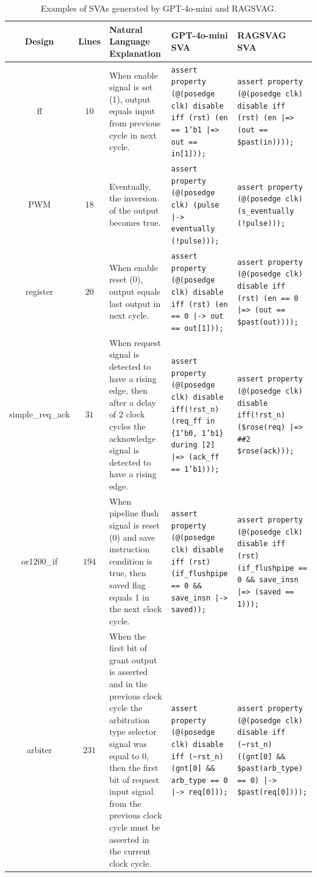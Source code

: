 \begin{table}[ht]
    \centering
    \caption{Examples of SVAs generated by GPT-4o-mini and RAGSVAG.}
    \label{tab:example_svas}
    \begin{tabular}{|c|c|p{3.8cm}|p{5.4cm}|p{5.4cm}|}
        \hline
        \textbf{Design} & \textbf{Lines} & \textbf{Natural Language Explanation} & \textbf{GPT-4o-mini SVA} & \textbf{RAGSVAG SVA} \\
        \hline
        ff & $10$ & When enable signal is set (1), output equals input from previous cycle in next cycle. & \texttt{assert property (@(posedge clk) disable iff (rst) (en == 1'b1 |=> out == in[1]));} & \texttt{assert property (@(posedge clk) disable iff (rst) (en |=> (out == \$past(in))));} \\
        \hline
        PWM & $18$ & Eventually, the inversion of the output becomes true. & \texttt{assert property (@(posedge clk) (pulse |-> eventually (!pulse)));} & \texttt{assert property (@(posedge clk) (s\_eventually (!pulse)));}\\
        \hline
        register & $20$ & When enable reset (0), output equals last output in next cycle. & \texttt{assert property (@(posedge clk) disable iff (rst) (en == 0 |-> out == out[1]));} & \texttt{assert property (@(posedge clk) disable iff (rst) (en == 0 |=> (out == \$past(out))));} \\
        \hline
        simple\_req\_ack & $31$ & When request signal is detected to have a rising edge, then after a delay of $2$ clock cycles the acknowledge signal is detected to have a rising edge. & \texttt{assert property (@(posedge clk) disable iff(!rst\_n) (req\_ff in \{1'b0, 1'b1\} during [2] |=> (ack\_ff == 1'b1)));} & \texttt{assert property (@(posedge clk) disable iff(!rst\_n) (\$rose(req) |=> \#\#2 \$rose(ack)));} \\
        \hline
        or1200\_if & $194$ & When pipeline flush signal is reset ($0$) and save instruction condition is true, then saved flag equals 1 in the next clock cycle. & \texttt{assert property (@(posedge clk) disable iff (rst) (if\_flushpipe == 0 \&\& save\_insn |-> saved));} & \texttt{assert property (@(posedge clk) disable iff (rst) (if\_flushpipe == 0 \&\& save\_insn |=> (saved == 1)));} \\
        \hline
        arbiter & $231$ & When the first bit of grant output is asserted and in the previous clock cycle the arbitration type selector signal was equal to $0$, then the first bit of request input signal from the previous clock cycle must be asserted in the current clock cycle. & \texttt{assert property (@(posedge clk) disable iff (\textasciitilde rst\_n) (gnt[0] \&\& arb\_type == 0 |-> req[0]));} & \texttt{assert property (@(posedge clk) disable iff (\textasciitilde rst\_n) ((gnt[0] \&\& \$past(arb\_type) == 0) |-> \$past(req[0])));} \\

\end{tabular}
\end{table}
